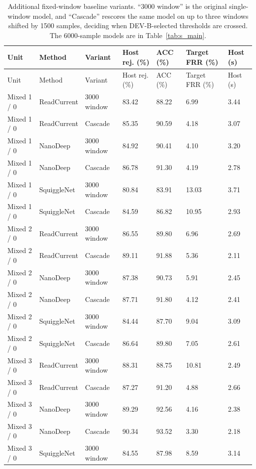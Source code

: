 \begin{longtable}{lllllll}
\caption{Additional fixed-window baseline variants. ``3000 window'' is the original single-window model, and ``Cascade'' rescores the same model on up to three windows shifted by 1500 samples, deciding when DEV-B-selected thresholds are crossed. The 6000-sample models are in Table~\ref{tab:s_main}.}\label{tab:s_window_extensions}\\
\toprule
Unit & Method & Variant & Host rej. (\%) & ACC (\%) & Target FRR (\%) & Host (s)\\\midrule\endfirsthead
\toprule
Unit & Method & Variant & Host rej. (\%) & ACC (\%) & Target FRR (\%) & Host (s)\\\midrule\endhead
\bottomrule\endfoot
Mixed 1 / 0 & ReadCurrent & 3000 window & 83.42 & 88.22 & 6.99 & 3.44\\
Mixed 1 / 0 & ReadCurrent & Cascade & 85.35 & 90.59 & 4.18 & 3.07\\
Mixed 1 / 0 & NanoDeep & 3000 window & 84.92 & 90.41 & 4.10 & 3.20\\
Mixed 1 / 0 & NanoDeep & Cascade & 86.78 & 91.30 & 4.19 & 2.78\\
Mixed 1 / 0 & SquiggleNet & 3000 window & 80.84 & 83.91 & 13.03 & 3.71\\
Mixed 1 / 0 & SquiggleNet & Cascade & 84.59 & 86.82 & 10.95 & 2.93\\
Mixed 2 / 0 & ReadCurrent & 3000 window & 86.55 & 89.80 & 6.96 & 2.69\\
Mixed 2 / 0 & ReadCurrent & Cascade & 89.11 & 91.88 & 5.36 & 2.11\\
Mixed 2 / 0 & NanoDeep & 3000 window & 87.38 & 90.73 & 5.91 & 2.45\\
Mixed 2 / 0 & NanoDeep & Cascade & 87.71 & 91.80 & 4.12 & 2.41\\
Mixed 2 / 0 & SquiggleNet & 3000 window & 84.44 & 87.70 & 9.04 & 3.09\\
Mixed 2 / 0 & SquiggleNet & Cascade & 86.64 & 89.80 & 7.05 & 2.61\\
Mixed 3 / 0 & ReadCurrent & 3000 window & 88.31 & 88.75 & 10.81 & 2.49\\
Mixed 3 / 0 & ReadCurrent & Cascade & 87.27 & 91.20 & 4.88 & 2.66\\
Mixed 3 / 0 & NanoDeep & 3000 window & 89.29 & 92.56 & 4.16 & 2.38\\
Mixed 3 / 0 & NanoDeep & Cascade & 90.34 & 93.52 & 3.30 & 2.18\\
Mixed 3 / 0 & SquiggleNet & 3000 window & 84.55 & 87.98 & 8.59 & 3.14\\

\end{longtable}
